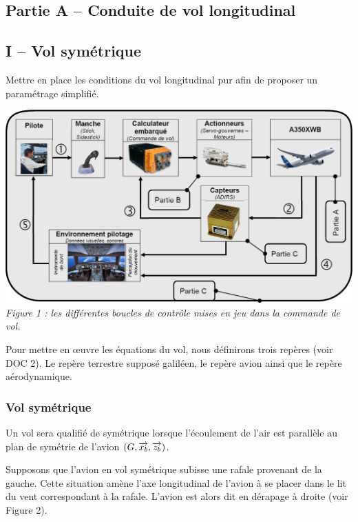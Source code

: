 \begin{multicols}{2}
\section*{Partie A -- Conduite de vol longitudinal}
\subsection*{I -- Vol symétrique}
\begin{obj}
Mettre en place les conditions du vol longitudinal pur afin de proposer un paramétrage simplifié.
\end{obj}
\begin{center}
\includegraphics[width=\linewidth]{images/fig_01}
\textit{Figure 1 : les différentes boucles de contrôle mises en jeu dans la commande de vol.}
\end{center}

Pour mettre en œuvre les équations du vol, nous définirons trois repères (voir DOC 2). Le repère terrestre supposé galiléen, le repère avion ainsi que le repère aérodynamique.

\subsubsection*{Vol symétrique}
Un vol sera qualifié de symétrique lorsque l’écoulement de l’air est parallèle au plan de symétrie de l’avion $(G, \overrightarrow{x_b},\overrightarrow{z_b})$.

Supposons que l’avion en vol symétrique subisse une rafale provenant de la gauche. Cette situation amène l’axe longitudinal de l’avion à se placer dans le lit du vent correspondant à la rafale. L’avion est alors dit en dérapage à droite (voir Figure 2).



\end{multicols}
